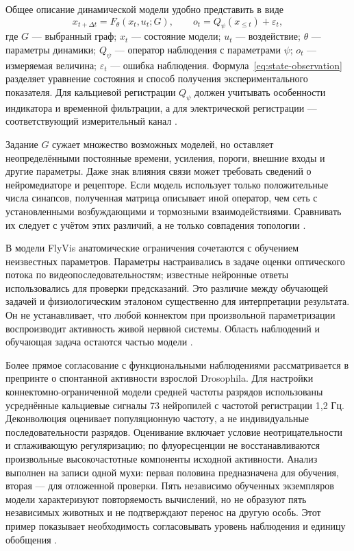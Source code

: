 Общее описание динамической модели удобно представить в виде
\begin{equation}
 x_{t+\Delta t}=F_{\theta}(x_t,u_t;G), \qquad
 o_t=Q_{\psi}(x_{\leq t})+\varepsilon_t,
 \label{eq:state-observation}
\end{equation}
где $G$ --- выбранный граф; $x_t$ --- состояние модели; $u_t$ --- воздействие; $\theta$ --- параметры динамики; $Q_{\psi}$ --- оператор наблюдения с параметрами $\psi$; $o_t$ --- измеряемая величина; $\varepsilon_t$ --- ошибка наблюдения. Формула~\eqref{eq:state-observation} разделяет уравнение состояния и способ получения экспериментального показателя. Для кальциевой регистрации $Q_{\psi}$ должен учитывать особенности индикатора и временной фильтрации, а для электрической регистрации --- соответствующий измерительный канал \cite{s212,s285}.

Задание $G$ сужает множество возможных моделей, но оставляет неопределёнными постоянные времени, усиления, пороги, внешние входы и другие параметры. Даже знак влияния связи может требовать сведений о нейромедиаторе и рецепторе. Если модель использует только положительные числа синапсов, полученная матрица описывает иной оператор, чем сеть с установленными возбуждающими и тормозными взаимодействиями. Сравнивать их следует с учётом этих различий, а не только совпадения топологии \cite{s743,s854}.

В модели FlyVis анатомические ограничения сочетаются с обучением неизвестных параметров. Параметры настраивались в задаче оценки оптического потока по видеопоследовательностям; известные нейронные ответы использовались для проверки предсказаний. Это различие между обучающей задачей и физиологическим эталоном существенно для интерпретации результата. Он не устанавливает, что любой коннектом при произвольной параметризации воспроизводит активность живой нервной системы. Область наблюдений и обучающая задача остаются частью модели \cite{s744}.

Более прямое согласование с функциональными наблюдениями рассматривается в препринте о спонтанной активности взрослой Drosophila. Для настройки коннектомно-ограниченной модели средней частоты разрядов использованы усреднённые кальциевые сигналы 73 нейропилей с частотой регистрации 1,2 Гц. Деконволюция оценивает популяционную частоту, а не индивидуальные последовательности разрядов. Оценивание включает условие неотрицательности и сглаживающую регуляризацию; по флуоресценции не восстанавливаются произвольные высокочастотные компоненты исходной активности. Анализ выполнен на записи одной мухи: первая половина предназначена для обучения, вторая --- для отложенной проверки. Пять независимо обученных экземпляров модели характеризуют повторяемость вычислений, но не образуют пять независимых животных и не подтверждают перенос на другую особь. Этот пример показывает необходимость согласовывать уровень наблюдения и единицу обобщения \cite{s739}.

